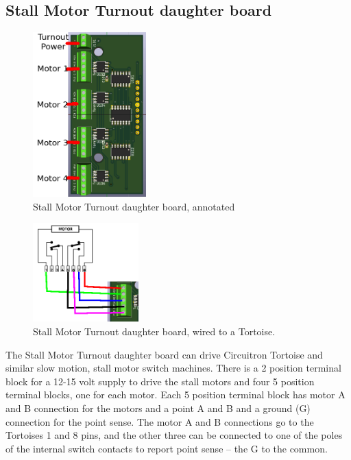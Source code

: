 \documentclass[12pt,twoside]{article}
\begin{document}
\subsection{Stall Motor Turnout daughter board}
\label{sect:SM-Daughter}
\begin{figure}[hbpt]\begin{centering}%
\includegraphics[height=2.5in]{SM-DaughterBoard-Annotated.png}
\caption{Stall Motor Turnout daughter board, annotated}
\end{centering}\end{figure}
\begin{figure}[hbpt]\begin{centering}%
\includegraphics[height=1.5in]{SM-DaughterBoard-TortoiseWiring.png}
\caption{Stall Motor Turnout daughter board, wired to a Tortoise.}
\end{centering}\end{figure}


The Stall Motor Turnout daughter board can drive Circuitron Tortoise and
similar slow motion, stall motor switch machines. There is a 2 position
terminal block for a 12-15 volt supply to drive the stall motors and four 5
position terminal blocks, one for each motor. Each 5 position terminal block
has motor A and B connection for the motors and a point A and B and a ground
(G) connection for the point sense. The motor A and B connections go to the
Tortoises 1 and 8 pins, and the other three can be connected to one of the
poles of the internal switch contacts to report point sense -- the G to the
common.
\end{document}
